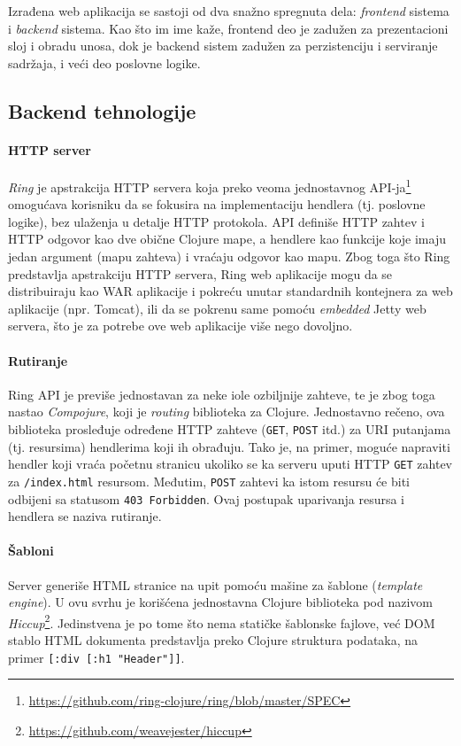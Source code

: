 Izrađena web aplikacija se sastoji od dva snažno spregnuta dela: \emph{frontend} sistema i \emph{backend} sistema. Kao što im ime kaže, frontend deo je zadužen za prezentacioni sloj i obradu unosa, dok je backend sistem zadužen za perzistenciju i serviranje sadržaja, i veći deo poslovne logike.

\subsection{Backend tehnologije}

\paragraph{HTTP server}
\emph{Ring}\cite{ring} je apstrakcija HTTP servera koja preko veoma jednostavnog API-ja\footnote{\url{https://github.com/ring-clojure/ring/blob/master/SPEC}} omogućava korisniku da se fokusira na implementaciju hendlera (tj. poslovne logike), bez ulaženja u detalje HTTP protokola. API definiše HTTP zahtev i HTTP odgovor kao dve obične Clojure mape, a hendlere kao funkcije koje imaju jedan argument (mapu zahteva) i vraćaju odgovor kao mapu. Zbog toga što Ring predstavlja apstrakciju HTTP servera, Ring web aplikacije mogu da se distribuiraju kao WAR aplikacije i pokreću unutar standardnih kontejnera za web aplikacije (npr. Tomcat), ili da se pokrenu same pomoću \textit{embedded} Jetty web servera, što je za potrebe ove web aplikacije više nego dovoljno.

\paragraph{Rutiranje}
Ring API je previše jednostavan za neke iole ozbiljnije zahteve, te je zbog toga nastao \emph{Compojure}\cite{compojure}, koji je \textit{routing} biblioteka za Clojure. Jednostavno rečeno, ova biblioteka prosleđuje određene HTTP zahteve (\texttt{GET}, \texttt{POST} itd.) za URI putanjama (tj. resursima) hendlerima koji ih obrađuju. Tako je, na primer, moguće napraviti hendler koji vraća početnu stranicu ukoliko se ka serveru uputi HTTP \texttt{GET} zahtev za \texttt{/index.html} resursom. Međutim, \texttt{POST} zahtevi ka istom resursu će biti odbijeni sa statusom \texttt{403 Forbidden}. Ovaj postupak uparivanja resursa i hendlera se naziva rutiranje.

\paragraph{Šabloni} Server generiše HTML stranice na upit pomoću mašine za šablone (\textit{template engine}). U ovu svrhu je korišćena jednostavna Clojure biblioteka pod nazivom \emph{Hiccup}\footnote{\url{https://github.com/weavejester/hiccup}}. Jedinstvena je po tome što nema statičke šablonske fajlove, već DOM stablo HTML dokumenta predstavlja preko Clojure struktura podataka, na primer \texttt{[:div  [:h1 "Header"]]}.

